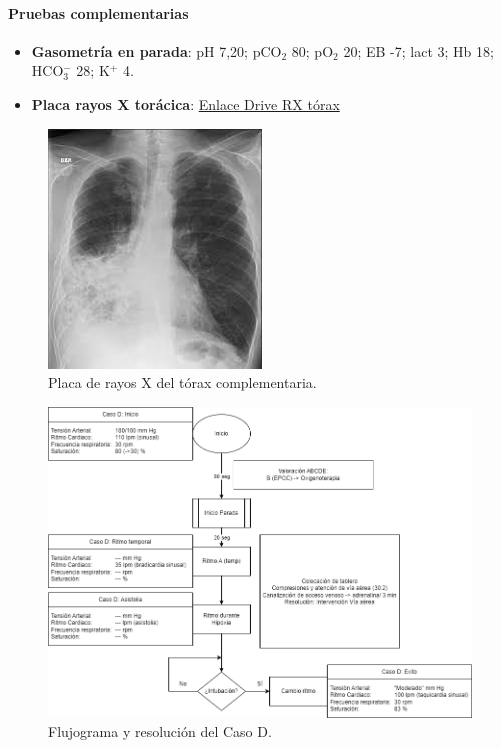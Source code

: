 \paragraph{Pruebas complementarias}
\begin{itemize}[topsep=0pt, partopsep=0pt,itemsep=0pt,parsep=0pt]
    \item \textbf{Gasometría en parada}: pH 7,20; pCO$_2$ 80; pO$_2$ 20; EB -7; lact 3; Hb 18; HCO$_3^-$ 28; K$^+$ 4.
    \item \textbf{Placa rayos X torácica}: \href{https://drive.google.com/file/d/10ItN9kxon6yGTPyf2Ivz0IKLV\_dT4vii/view?usp=share\_link}{Enlace Drive RX tórax}
\end{itemize}

\begin{figure}[hptb]
    \centering
	\includegraphics[width=0.25\linewidth]{./imagenes/UCIDoc-SVICasoDRXTorax.png}
	\caption{\label{fig:Brusilov:SVI:CasoDRXTorax}Placa de rayos X del tórax complementaria.}
\end{figure}

\begin{figure}[hptb]
    \centering
	\includegraphics[width=0.8\linewidth]{./imagenes/ACV-AdSC-CasosUCI_CasoD.png}
	\caption{\label{fig:Brusilov:SVI:CasoD}Flujograma y resolución del Caso D.}
\end{figure}



